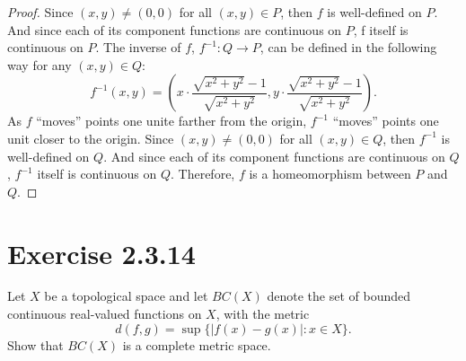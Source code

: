 \documentclass[12pt]{article}
\newenvironment{problem}
    {\begin{lrbox}{\mybox}\begin{minipage}{\textwidth-10pt}}
    {\end{minipage}\end{lrbox}\framebox[6.5in]{\usebox{\mybox}}\\}
\begin{document}
\begin{proof}
    Since $(x,y)\ne(0,0)$ for all $(x,y)\in P$, then $f$ is well-defined on $P$. And since each of its component functions are continuous on $P$, f itself is continuous on $P$. The inverse of $f$, $f^{-1}:Q\to P$, can be defined in the following way for any $(x,y)\in Q$:
    \[f^{-1}(x,y) = \left(x\cdot\frac{\sqrt{x^2+y^2}-1}{\sqrt{x^2+y^2}}, y\cdot \frac{\sqrt{x^2+y^2}-1}{\sqrt{x^2+y^2}}\right).\]
    As $f$ ``moves'' points one unite farther from the origin, $f^{-1}$ ``moves'' points one unit closer to the origin. Since $(x,y)\ne(0,0)$ for all $(x,y)\in Q$, then $f^{-1}$ is well-defined on $Q$. And since each of its component functions are continuous on $Q$, $f^{-1}$ itself is continuous on $Q$. Therefore, $f$ is a homeomorphism between $P$ and $Q$.
    
\end{proof}

\section*{Exercise 2.3.14}
\begin{problem}
    Let $X$ be a topological space and let $BC(X)$ denote the set of bounded continuous real-valued functions on $X$, with the metric
    \[d(f,g) = \sup\{|f(x)-g(x)| : x\in X\}.\]
    Show that $BC(X)$ is a complete metric space.
\end{problem}
\end{document}

